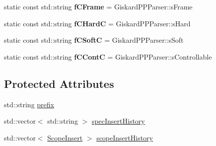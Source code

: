 \begin{DoxyCompactItemize}
\item 
\hypertarget{classgiskard__suturo_1_1AdvancedScope_a9b4dd4bb9124f90e49adfaaf1b8b5ba5}{static const std\-::string {\bfseries f\-C\-Frame} = Giskard\-P\-P\-Parser\-::s\-Frame}\label{classgiskard__suturo_1_1AdvancedScope_a9b4dd4bb9124f90e49adfaaf1b8b5ba5}

\item 
\hypertarget{classgiskard__suturo_1_1AdvancedScope_ae2d7c13d5e7940be15a9dfd9c0f0dda1}{static const std\-::string {\bfseries f\-C\-Hard\-C} = Giskard\-P\-P\-Parser\-::s\-Hard}\label{classgiskard__suturo_1_1AdvancedScope_ae2d7c13d5e7940be15a9dfd9c0f0dda1}

\item 
\hypertarget{classgiskard__suturo_1_1AdvancedScope_aff09a5d9175eb5ecd2e623eea81cb574}{static const std\-::string {\bfseries f\-C\-Soft\-C} = Giskard\-P\-P\-Parser\-::s\-Soft}\label{classgiskard__suturo_1_1AdvancedScope_aff09a5d9175eb5ecd2e623eea81cb574}

\item 
\hypertarget{classgiskard__suturo_1_1AdvancedScope_acd3551f4badb7c595a2c37739b09d12c}{static const std\-::string {\bfseries f\-C\-Cont\-C} = Giskard\-P\-P\-Parser\-::s\-Controllable}\label{classgiskard__suturo_1_1AdvancedScope_acd3551f4badb7c595a2c37739b09d12c}

\end{DoxyCompactItemize}
\subsection*{Protected Attributes}
\begin{DoxyCompactItemize}
\item 
std\-::string \hyperlink{classgiskard__suturo_1_1AdvancedScope_ac69aab3b5b22fc62d1d0f8e213e86ec5}{prefix}
\item 
std\-::vector$<$ std\-::string $>$ \hyperlink{classgiskard__suturo_1_1AdvancedScope_a6a788662a6c7df9eaa3a8419b466990d}{spec\-Insert\-History}
\item 
std\-::vector$<$ \hyperlink{structgiskard__suturo_1_1AdvancedScope_1_1ScopeInsert}{Scope\-Insert} $>$ \hyperlink{classgiskard__suturo_1_1AdvancedScope_af5081ec45e81c905ed286da7a72532c3}{scope\-Insert\-History}
\end{DoxyCompactItemize}
